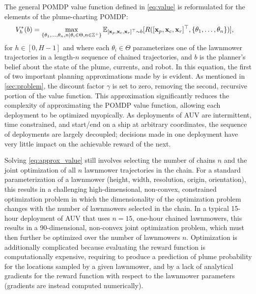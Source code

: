 The general POMDP value function defined in \cref{eq:value} is reformulated for the elements of the plume-charting POMDP:
\begin{align}
     V_h^{*}(b) &=  \max_{\{\theta_1, \dots, \theta_n, n \mid \theta_i \in \Theta, n \in \mathbb{Z}^+\}} \mathbb{E}_{[\mathbf{x}_{p}, \mathbf{x}_{c}, \mathbf{x}_{r}]^\top \sim b}[R([\mathbf{x}_{p}, \mathbf{x}_{c}, \mathbf{x}_{r}]^\top, \{\theta_1, \dots, \theta_n\})],
    \label{eq:approx_value}
\end{align}
\noindent for $h \in [0, H-1]$ and where each $\theta_i \in \Theta$ parameterizes one of the lawnmower trajectories in a length-$n$ sequence of chained trajectories, and $b$ is the planner's belief about the state of the plume, currents, and robot. In this equation, the first of two important planning approximations made by \PHORTEX is evident. As mentioned in \cref{sec:problem}, the discount factor $\gamma$ is set to zero, removing the second, recursive portion of the value function. This approximation significantly reduces the complexity of approximating the POMDP value function, allowing each deployment to be optimized myopically. As deployments of AUV \Sentry are intermittent, time constrained, and start/end on a ship at arbitrary coordinates, the sequence of deployments are largely decoupled; decisions made in one deployment have very little impact on the achievable reward of the next.

Solving \cref{eq:approx_value} still involves selecting the number of chains $n$ and the joint optimization of all $n$ lawnmower trajectories in the chain. For a standard parameterization of a lawnmower (height, width, resolution, origin, orientation), this results in a challenging high-dimensional, non-convex, constrained optimization problem in which the dimensionality of the optimization problem changes with the number of lawnmowers selected in the chain. In a typical 15-hour deployment of AUV \Sentry that uses $n=15$, one-hour chained lawnmowers, this results in a 90-dimensional, non-convex joint optimization problem, which must then further be optimized over the number of lawnmowers $n$. Optimization is additionally complicated because evaluating the reward function is computationally expensive, requiring \PHUMES to produce a prediction of plume probability for the locations sampled by a given lawnmower, and by a lack of analytical gradients for the reward function with respect to the lawnmower parameters (gradients are instead computed numerically). 

